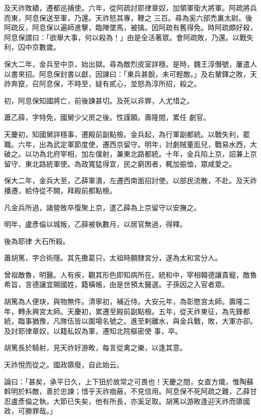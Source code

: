 \begin{pinyinscope}
 及天祚敗績，遷都巡捕使。六年，從阿疏討耶律章奴，加領軍衛大將軍。阿疏將兵而東，阿息保送至軍，乃還。天祚怒其專，鞭之
 三百。尋為奚六部禿裏太尉。後阿疏反，阿息保以遍師進擊，臨陣墜馬，被擒。因阿疏有舊得免。時阿疏頗好殺，阿息保謂曰：「欲舉大事，何以殺為！」由是全活著眾。會阿疏敗，乃還。以戰失利，囚中京數歲。



 保大二年，金兵至中京，始出獄。尋為敵烈皮室詳穩。是時，魏王淳僭號，屢遣人以書來招。阿息保封書以獻，因諫曰：「東兵甚銳，未可輕敵。」及右輦鐸之敗，天祚奔竄，召阿息保，不時至，疑有貳心，並怒為淳所招，殺之。



 初，阿息保知國將亡，前後諫甚切。及死以非罪，人尤惜之。



 蕭乙薛，字特免，國舅少父房之後。性謹願。壽隆間，累任
 劇官。



 天慶初，知國舅詳穩事，遷殿前副點檢。金兵起，為行軍副都統。以戰失利，罷職。六年，出為武定軍節度使，遷西京留守。明年，討劇賊董厖兒，戰易水西，大破之。以功為北府宰相，加左僕射，兼東北路都統。十年，金兵陷上京，詔兼上京留守、東北路統軍使。為政寬猛得宜，民之窮困者，輒加振恤，眾咸愛之。



 保大二年，金兵大至，乙薛軍潰，左遷西南面招討使。以部民流散，不赴。及天祚播遷，給侍從不闕，拜殿前都點檢。



 凡金兵所過，諸營敗卒復聚上京，遣乙薛為上京留守以安撫之。



 明年，盧彥倫以城叛，乙薛被執數月，以居官無過，得釋。



 後為耶律
 大石所殺。



 蕭胡篤，字合術隱。其先撒葛只，太祖時願隸宮分，遂為太和宮分人。



 曾祖敵魯，明醫。人有疾，觀其形色即知病所在。統和中，宰相韓德讓貴寵，敵魯希旨，言德讓宜賜國姓，籍橫帳，由是世預太醫選。子孫因之入官者眾。



 胡篤為人便玦，與物無件。清寧初，補近侍。大安元年，為彰愍宮太師。壽隆二年，轉永興宮太師。天慶初，累遷至殿前副點檢。五年，從天祚東征，為先鋒都統，臨事猶豫，凡隊伍皆以圍場名號之。進至剌離水，與金兵戰，敗，大軍亦卻。及討耶律章奴，以籍私奴為軍，遷知北院樞密使
 事，卒。



 胡篤長於騎射，見天祚好游畋，每言從禽之樂，以逢其意。



 天祚悅而從之。國政隳廢，自此始云。



 論曰：「甚矣，承平日久，上下狃於故常之可畏也！天慶之間，女直方熾，惟陶蘇斡明於料敵，善於忠諫；惜乎天祚痼蔽，不見信用。阿息保不死阿疏之難，乙薛甘忍盧彥倫之執，大節已失矣，他有所長，亦奚足取。胡篤以游畋逢迎天祚而隳國政，可勝罪哉。」



\end{pinyinscope}